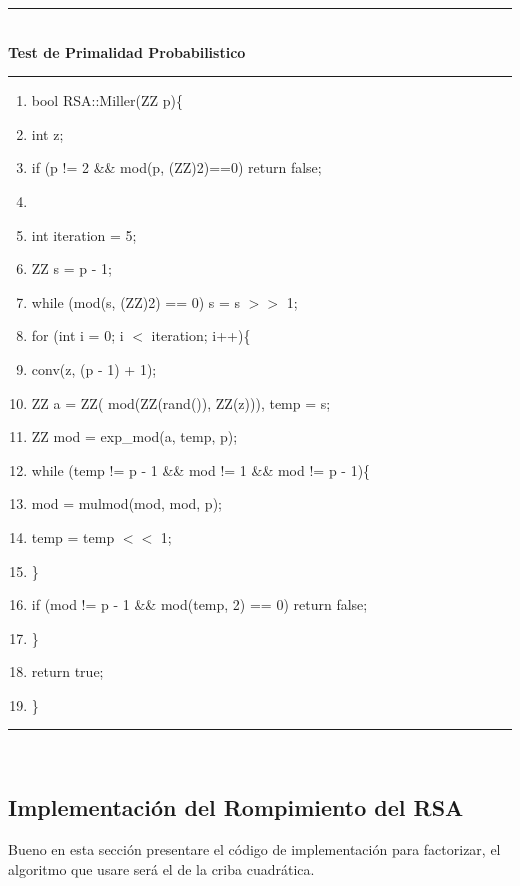 \documentclass[11pt, conference]{IEEEtran}
\begin{document}
\rule[0mm]{181mm}{0.1mm}\\
\textbf{Test de Primalidad Probabilistico}\\
\rule[3mm]{181mm}{0.1mm}
\begin{enumerate}
	\item bool RSA::Miller(ZZ p)\{
	\item \qquad int z;
	\item \qquad if (p != 2 \&\& mod(p, (ZZ)2)==0)	return false;
	\item	
	\item \qquad int iteration = 5;
	\item \qquad ZZ s = p - 1;
	\item \qquad while (mod(s, (ZZ)2) == 0)      s = s $>>$ 1;
	\item \qquad for (int i = 0; i $<$ iteration; i++)\{
	\item \qquad\qquad conv(z, (p - 1) + 1);
	\item \qquad\qquad ZZ a = ZZ( mod(ZZ(rand()), ZZ(z))), temp = s;
	\item \qquad\qquad ZZ mod = exp\_mod(a, temp, p);
	\item \qquad\qquad while (temp != p - 1 \&\& mod != 1 \&\& mod != p - 1)\{
	\item \qquad\qquad\qquad mod = mulmod(mod, mod, p);
	\item \qquad\qquad\qquad temp = temp $<<$ 1;
	\item \qquad\qquad\}
	\item \qquad\qquad if (mod != p - 1 \&\& mod(temp, 2) == 0) return false;
	\item \qquad\}
	\item \qquad return true;
	\item\}
\end{enumerate}
\rule[0mm]{181mm}{0.1mm}\\


\subsection{Implementación del Rompimiento del RSA}
Bueno en esta sección presentare el código de implementación para factorizar, el algoritmo que usare será el de la criba cuadrática.

\
\end{document}

